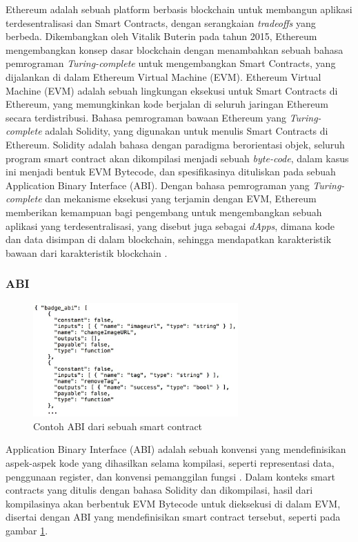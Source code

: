 Ethereum adalah sebuah platform berbasis blockchain untuk membangun aplikasi terdesentralisasi dan Smart Contracts, dengan serangkaian \textit{tradeoffs} yang berbeda. Dikembangkan oleh Vitalik Buterin pada tahun 2015, Ethereum mengembangkan konsep dasar blockchain dengan menambahkan sebuah bahasa pemrograman \textit{Turing-complete} untuk mengembangkan Smart Contracts, yang dijalankan di dalam Ethereum Virtual Machine (EVM). Ethereum Virtual Machine (EVM) adalah sebuah lingkungan eksekusi untuk Smart Contracts di Ethereum, yang memungkinkan kode berjalan di seluruh jaringan Ethereum secara terdistribusi. Bahasa pemrograman bawaan Ethereum yang \textit{Turing-complete} adalah Solidity, yang digunakan untuk menulis Smart Contracts di Ethereum. Solidity adalah bahasa dengan paradigma berorientasi objek, seluruh program smart contract akan dikompilasi menjadi sebuah \textit{byte-code}, dalam kasus ini menjadi bentuk EVM Bytecode, dan spesifikasinya dituliskan pada sebuah Application Binary Interface (ABI). Dengan bahasa pemrograman yang \textit{Turing-complete} dan mekanisme eksekusi yang terjamin dengan EVM, Ethereum memberikan kemampuan bagi pengembang untuk mengembangkan sebuah aplikasi yang terdesentralisasi, yang disebut juga sebagai \textit{dApps}, dimana kode dan data disimpan di dalam blockchain, sehingga mendapatkan karakteristik bawaan dari karakteristik blockchain \parencite{buterin2013ethereum}.

\subsubsection{ABI}
\label{subsubsec:abi}

\begin{figure}
  \centering
  \includegraphics[width=0.7\textwidth]{resources/chapter-2/smart-contract-abi.jpg}
  \caption{Contoh ABI dari sebuah smart contract \parencite{third2017linked}}
  \label{image:abi-example}
\end{figure}

Application Binary Interface (ABI) adalah sebuah konvensi yang mendefinisikan aspek-aspek kode yang dihasilkan selama kompilasi, seperti representasi data, penggunaan register, dan konvensi pemanggilan fungsi \parencite{sciencedirect2024}. Dalam konteks smart contracts yang ditulis dengan bahasa Solidity dan dikompilasi, hasil dari kompilasinya akan berbentuk EVM Bytecode untuk dieksekusi di dalam EVM, disertai dengan ABI yang mendefinisikan smart contract tersebut, seperti pada gambar \ref{image:abi-example}.


